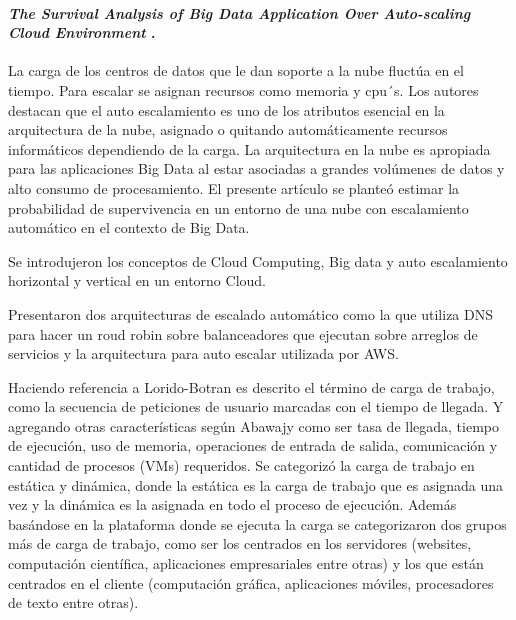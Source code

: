 \paragraph{
    \textbf{\emph{The Survival Analysis of Big Data Application
    Over Auto-scaling Cloud Environment}
    }
    \cite[pág. 155]{somani_emerging_2019}.
}


La carga de los centros de datos que le dan soporte a la nube fluctúa en el tiempo.
Para escalar se asignan recursos como memoria y cpu´s. 
Los autores destacan que el auto escalamiento es uno de los atributos esencial en la arquitectura de la nube, asignado o quitando automáticamente recursos informáticos dependiendo de la carga.
La arquitectura en la nube es apropiada para las aplicaciones Big Data al estar asociadas a grandes volúmenes de datos y alto consumo de procesamiento.
El presente artículo se planteó estimar la probabilidad de supervivencia
en un entorno de una nube con escalamiento automático en el contexto de Big Data.

Se introdujeron los conceptos de Cloud Computing, Big data y auto escalamiento horizontal y vertical en un entorno Cloud.

Presentaron dos arquitecturas de escalado automático como la que utiliza DNS para hacer un roud robin sobre balanceadores que ejecutan sobre arreglos de servicios y la arquitectura para auto escalar utilizada por AWS.

Haciendo referencia a Lorido-Botran es descrito el término de carga de trabajo, 
como la secuencia de peticiones de usuario marcadas con el tiempo de llegada. Y agregando otras características según Abawajy como ser tasa de llegada, tiempo de ejecución, uso de memoria, operaciones de entrada de salida, comunicación y cantidad de procesos (VMs) requeridos. Se categorizó la carga de trabajo en estática y dinámica, donde la estática 
es la carga de trabajo que es asignada una vez y la dinámica es la asignada en todo el proceso de ejecución. 
Además basándose en la plataforma donde se ejecuta la carga se categorizaron dos grupos más de carga de trabajo, como ser los centrados en los servidores (websites, computación científica, aplicaciones empresariales entre otras) y los que están centrados en el cliente (computación gráfica, aplicaciones móviles, procesadores de texto entre otras). 

